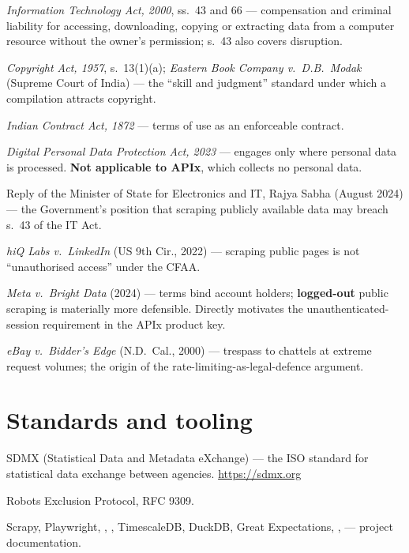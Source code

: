 \begin{enumerate}[label={[\arabic*]},start=33]
\item \emph{Information Technology Act, 2000}, ss.\ 43 and 66 --- compensation and criminal
liability for accessing, downloading, copying or extracting data from a computer resource
without the owner's permission; s.\ 43 also covers disruption.

\item \emph{Copyright Act, 1957}, s.\ 13(1)(a); \emph{Eastern Book Company v.\ D.B.\ Modak}
(Supreme Court of India) --- the ``skill and judgment'' standard under which a compilation
attracts copyright.

\item \emph{Indian Contract Act, 1872} --- terms of use as an enforceable contract.

\item \emph{Digital Personal Data Protection Act, 2023} --- engages only where personal data
is processed. \textbf{Not applicable to APIx}, which collects no personal data.

\item Reply of the Minister of State for Electronics and IT, Rajya Sabha (August 2024) ---
the Government's position that scraping publicly available data may breach s.\ 43 of the IT
Act.

\item \emph{hiQ Labs v.\ LinkedIn} (US 9th Cir., 2022) --- scraping public pages is not
``unauthorised access'' under the CFAA.

\item \emph{Meta v.\ Bright Data} (2024) --- terms bind account holders; \textbf{logged-out}
public scraping is materially more defensible. Directly motivates the unauthenticated-session
requirement in the APIx product key.

\item \emph{eBay v.\ Bidder's Edge} (N.D.\ Cal., 2000) --- trespass to chattels at extreme
request volumes; the origin of the rate-limiting-as-legal-defence argument.
\end{enumerate}

\section{Standards and tooling}

\begin{enumerate}[label={[\arabic*]},start=41]
\item SDMX (Statistical Data and Metadata eXchange) --- the ISO standard for statistical data
exchange between agencies. \url{https://sdmx.org}
\item Robots Exclusion Protocol, RFC 9309.
\item Scrapy, Playwright, , , TimescaleDB, DuckDB, Great
Expectations, ,  --- project documentation.
\end{enumerate}

